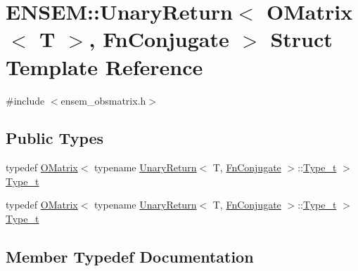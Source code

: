 \hypertarget{structENSEM_1_1UnaryReturn_3_01OMatrix_3_01T_01_4_00_01FnConjugate_01_4}{}\section{E\+N\+S\+EM\+:\+:Unary\+Return$<$ O\+Matrix$<$ T $>$, Fn\+Conjugate $>$ Struct Template Reference}
\label{structENSEM_1_1UnaryReturn_3_01OMatrix_3_01T_01_4_00_01FnConjugate_01_4}


{\ttfamily \#include $<$ensem\+\_\+obsmatrix.\+h$>$}

\subsection*{Public Types}
\begin{DoxyCompactItemize}
\item 
typedef \mbox{\hyperlink{classENSEM_1_1OMatrix}{O\+Matrix}}$<$ typename \mbox{\hyperlink{structENSEM_1_1UnaryReturn}{Unary\+Return}}$<$ T, \mbox{\hyperlink{structENSEM_1_1FnConjugate}{Fn\+Conjugate}} $>$\+::\mbox{\hyperlink{structENSEM_1_1UnaryReturn_3_01OMatrix_3_01T_01_4_00_01FnConjugate_01_4_ac5de4bf0142b30100d4ade43fc2817d8}{Type\+\_\+t}} $>$ \mbox{\hyperlink{structENSEM_1_1UnaryReturn_3_01OMatrix_3_01T_01_4_00_01FnConjugate_01_4_ac5de4bf0142b30100d4ade43fc2817d8}{Type\+\_\+t}}
\item 
typedef \mbox{\hyperlink{classENSEM_1_1OMatrix}{O\+Matrix}}$<$ typename \mbox{\hyperlink{structENSEM_1_1UnaryReturn}{Unary\+Return}}$<$ T, \mbox{\hyperlink{structENSEM_1_1FnConjugate}{Fn\+Conjugate}} $>$\+::\mbox{\hyperlink{structENSEM_1_1UnaryReturn_3_01OMatrix_3_01T_01_4_00_01FnConjugate_01_4_ac5de4bf0142b30100d4ade43fc2817d8}{Type\+\_\+t}} $>$ \mbox{\hyperlink{structENSEM_1_1UnaryReturn_3_01OMatrix_3_01T_01_4_00_01FnConjugate_01_4_ac5de4bf0142b30100d4ade43fc2817d8}{Type\+\_\+t}}
\end{DoxyCompactItemize}


\subsection{Member Typedef Documentation}
\mbox{\label{structENSEM_1_1UnaryReturn_3_01OMatrix_3_01T_01_4_00_01FnConjugate_01_4_ac5de4bf0142b30100d4ade43fc2817d8}} 
